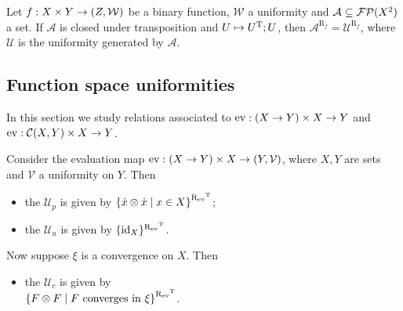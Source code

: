 \begin{lemma}
Let $f: X\times Y\to \sSet{Z, \mathcal{W}}$ be a binary function, $\mathcal{W}$ a uniformity and $\mathcal{A}\subseteq \operatorname{\mathcal{FP}}(X^2)$ a set. If $\mathcal{A}$ is closed under transposition and $U\mapsto U^{\mathrm{T}};U$, then $\mathcal{A}^{\mathrm{R}_{f}} = \mathcal{U}^{\mathrm{R}_{f}}$, where $\mathcal{U}$ is the uniformity generated by $\mathcal{A}$.
\end{lemma}

\subsection{Function space uniformities}
In this section we study relations associated to $\operatorname{ev}: (X\to Y) \times X \to Y$ and $\operatorname{ev}: \operatorname{\mathcal{C}}(X, Y) \times X \to Y$.

\begin{definition}
Consider the evaluation map $\evalMap: (X\to Y)\times X \to \sSet{Y,\mathcal{V}}$, where $X, Y$ are sets and $\mathcal{V}$ a uniformity on $Y$. Then
\begin{itemize}
\item the  $\mathcal{U}_p$ is given by $\setbuilder{\pfilter{x}\otimes\pfilter{x}}{x\in X}^{\uRelEv^\transp}$;
\item the  $\mathcal{U}_u$ is given by $\{\operatorname{id}_X\}^{\mathrel{\mathrm{R}_{\operatorname{ev}}}^{\mathrm{T}}}$.
\end{itemize}
Now suppose $\xi$ is a convergence on $X$. Then
\begin{itemize}
\item the  $\mathcal{U}_c$ is given by \\ $\setbuilder{F\otimes F}{\text{$F$ converges in $\xi$}}^{\uRelEv^\transp}$.
\end{itemize}
\end{definition}


